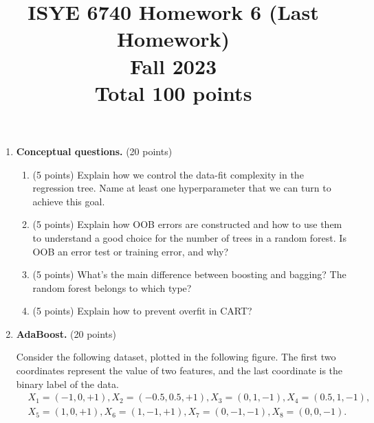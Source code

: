 \documentclass[twoside,10pt]{article}
\begin{document}
\title{ISYE 6740 Homework 6 (Last Homework)\\ 
Fall 2023\\ 
\small Total 100 points}
\date{}
\maketitle






\begin{enumerate}


\item {\bf Conceptual questions.} (20 points)

\begin{enumerate}

\item (5 points) Explain how we control the data-fit complexity in the regression tree. Name at least one hyperparameter that we can turn to achieve this goal.

\item (5 points) Explain how OOB errors are constructed and how to use them to understand a good choice for the number of trees in a random forest. Is OOB an error test or training error, and why?

\item (5 points) What's the main difference between boosting and bagging? The random forest belongs to which type?

\item (5 points) Explain how to prevent overfit in CART?

\end{enumerate}



\item  {\bf AdaBoost.} (20 points)

Consider the following dataset, plotted in the following figure. The first two coordinates represent the value of two features, and the last coordinate is the binary label of the data.
\begin{equation*}
\begin{split}
&X_1 = (-1, 0, +1), X_2 = (-0.5, 0.5, +1), X_3 = (0, 1, -1), X_4 = (0.5, 1, -1), \\
&X_5 = (1, 0, +1), X_6 = (1, -1, +1), X_7 = (0, -1, -1), X_8 = (0, 0, -1).
\end{split}
\end{equation*}


\end{enumerate}
\end{document}
